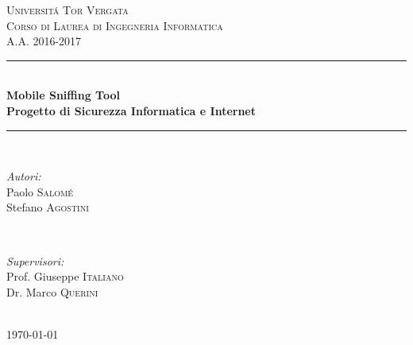 \documentclass[12pt]{article} %
\begin{document}

\begin{titlepage}

\newcommand{\HRule}{\rule{\linewidth}{0.5mm}} %

\center %

\textsc{\LARGE Universit\'a Tor Vergata}\\[1.5cm] %
\textsc{\Large Corso di Laurea di Ingegneria Informatica}\\[0.5cm] %
\textsc{\large A.A. 2016-2017}\\[0.5cm] %

\HRule \\[0.4cm]
{ \huge \bfseries Mobile Sniffing Tool}\\[0.4cm] %
{ \bfseries Progetto di Sicurezza Informatica e Internet}\\[0,4cm]
\HRule \\[1.5cm]

\begin{minipage}{0.4\textwidth}
\begin{flushleft} \large
\emph{Autori:}\\
Paolo \textsc{Salom\'e}\\
Stefano \textsc{Agostini} %
\end{flushleft}
\end{minipage}
~
\begin{minipage}{0.4\textwidth}
\begin{flushright} \large
\emph{Supervisori:}\\
Prof. Giuseppe \textsc{Italiano}\\ 
Dr. Marco \textsc{Querini}  %
\end{flushright}
\end{minipage}\\[8,5cm]

{\large \today}\\[3cm] %


\vfill %

\end{titlepage}
\end{document}
